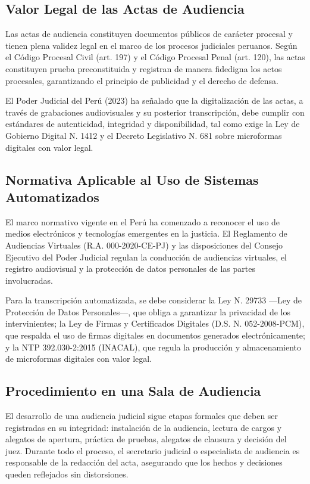 \documentclass[12pt,a4paper,oneside]{report}
\begin{document}
\subsection{Valor Legal de las Actas de Audiencia}

Las actas de audiencia constituyen documentos públicos de carácter procesal y tienen plena validez legal en el marco de los procesos judiciales peruanos. Según el Código Procesal Civil (art. 197) y el Código Procesal Penal (art. 120), las actas constituyen prueba preconstituida y registran de manera fidedigna los actos procesales, garantizando el principio de publicidad y el derecho de defensa.

El Poder Judicial del Perú (2023) ha señalado que la digitalización de las actas, a través de grabaciones audiovisuales y su posterior transcripción, debe cumplir con estándares de autenticidad, integridad y disponibilidad, tal como exige la Ley de Gobierno Digital N.\textordmasculine{} 1412 y el Decreto Legislativo N.\textordmasculine{} 681 sobre microformas digitales con valor legal.

\subsection{Normativa Aplicable al Uso de Sistemas Automatizados}

El marco normativo vigente en el Perú ha comenzado a reconocer el uso de medios electrónicos y tecnologías emergentes en la justicia. El Reglamento de Audiencias Virtuales (R.A. 000-2020-CE-PJ) y las disposiciones del Consejo Ejecutivo del Poder Judicial regulan la conducción de audiencias virtuales, el registro audiovisual y la protección de datos personales de las partes involucradas.

Para la transcripción automatizada, se debe considerar la Ley N.\textordmasculine{} 29733 ---Ley de Protección de Datos Personales---, que obliga a garantizar la privacidad de los intervinientes; la Ley de Firmas y Certificados Digitales (D.S. N.\textordmasculine{} 052-2008-PCM), que respalda el uso de firmas digitales en documentos generados electrónicamente; y la NTP 392.030-2:2015 (INACAL), que regula la producción y almacenamiento de microformas digitales con valor legal.

\subsection{Procedimiento en una Sala de Audiencia}

El desarrollo de una audiencia judicial sigue etapas formales que deben ser registradas en su integridad: instalación de la audiencia, lectura de cargos y alegatos de apertura, práctica de pruebas, alegatos de clausura y decisión del juez. Durante todo el proceso, el secretario judicial o especialista de audiencia es responsable de la redacción del acta, asegurando que los hechos y decisiones queden reflejados sin distorsiones.
\end{document}
